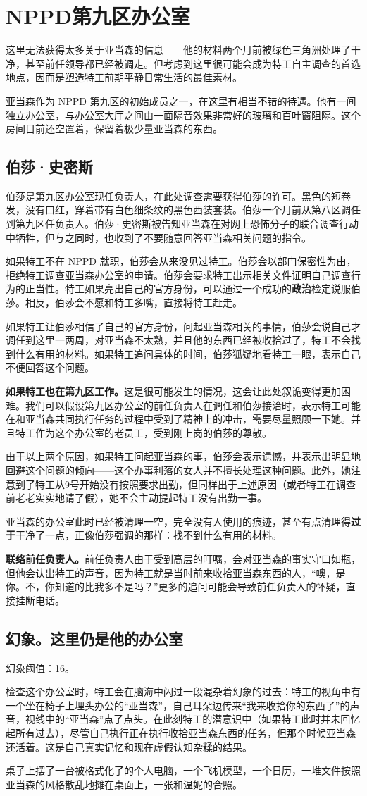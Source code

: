 \section{NPPD第九区办公室}
这里无法获得太多关于亚当森的信息——他的材料两个月前被绿色三角洲处理了干净，甚至前任领导都已经被调走。但考虑到这里很可能会成为特工自主调查的首选地点，因而是塑造特工前期平静日常生活的最佳素材。

亚当森作为 NPPD 第九区的初始成员之一，在这里有相当不错的待遇。他有一间独立办公室，与办公室大厅之间由一面隔音效果非常好的玻璃和百叶窗阻隔。这个房间目前还空置着，保留着极少量亚当森的东西。

\subsection{伯莎·史密斯}
伯莎是第九区办公室现任负责人，在此处调查需要获得伯莎的许可。黑色的短卷发，没有口红，穿着带有白色细条纹的黑色西装套装。伯莎一个月前从第八区调任到第九区任负责人。伯莎·史密斯被告知亚当森在对网上恐怖分子的联合调查行动中牺牲，但与之同时，也收到了不要随意回答亚当森相关问题的指令。

如果特工不在 NPPD 就职，伯莎会从来没见过特工。伯莎会以部门保密性为由，拒绝特工调查亚当森办公室的申请。伯莎会要求特工出示相关文件证明自己调查行为的正当性。特工如果亮出自己的官方身份，可以通过一个成功的\textbf{政治}检定说服伯莎。相反，伯莎会不愿和特工多嘴，直接将特工赶走。

如果特工让伯莎相信了自己的官方身份，问起亚当森相关的事情，伯莎会说自己才调任到这里一两周，对亚当森不太熟，并且他的东西已经被收拾过了，特工不会找到什么有用的材料。如果特工追问具体的时间，伯莎狐疑地看特工一眼，表示自己不便回答这个问题。

\textbf{如果特工也在第九区工作。}这是很可能发生的情况，这会让此处叙诡变得更加困难。我们可以假设第九区办公室的前任负责人在调任和伯莎接洽时，表示特工可能在和亚当森共同执行任务的过程中受到了精神上的冲击，需要尽量照顾一下她。并且特工作为这个办公室的老员工，受到刚上岗的伯莎的尊敬。

由于以上两个原因，如果特工问起亚当森的事，伯莎会表示遗憾，并表示出明显地回避这个问题的倾向——这个办事利落的女人并不擅长处理这种问题。此外，她注意到了特工从9号开始没有按照要求出勤，但同样出于上述原因（或者特工在调查前老老实实地请了假），她不会主动提起特工没有出勤一事。

亚当森的办公室此时已经被清理一空，完全没有人使用的痕迹，甚至有点清理得\textbf{过于}干净了一点，正像伯莎强调的那样：找不到什么有用的材料。

\textbf{联络前任负责人。}前任负责人由于受到高层的叮嘱，会对亚当森的事实守口如瓶，但他会认出特工的声音，因为特工就是当时前来收拾亚当森东西的人，“噢，是你。不，你知道的比我多不是吗？”更多的追问可能会导致前任负责人的怀疑，直接挂断电话。

\subsection{幻象。这里仍是他的办公室}
幻象阈值：16。

检查这个办公室时，特工会在脑海中闪过一段混杂着幻象的过去：特工的视角中有一个坐在椅子上埋头办公的“亚当森”，自己耳朵边传来“我来收拾你的东西了”的声音，视线中的“亚当森”点了点头。在此刻特工的潜意识中（如果特工此时并未回忆起所有过去），尽管自己执行正在执行收拾亚当森东西的任务，但那个时候亚当森还活着。这是自己真实记忆和现在虚假认知杂糅的结果。

桌子上摆了一台被格式化了的个人电脑，一个飞机模型，一个日历，一堆文件按照亚当森的风格散乱地摊在桌面上，一张和温妮的合照。
